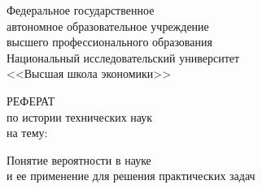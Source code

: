 \documentclass[12pt]{report}
\begin{document}

\thispagestyle{empty}
\begin{center}
Федеральное государственное \\
автономное образовательное учреждение \\
высшего профессионального образования\\

\Large Национальный исследовательский университет\\
\Large <<Высшая школа экономики>>\\



\end{center}

\vbox{\vspace{2cm}}

\hangindent=8cm


\vbox{\vspace{10mm}}\noindent %
\noindent



\begin{center}
\large РЕФЕРАТ \\
\large по истории технических наук\\

\large на тему:

\huge {\sc
Понятие вероятности в науке \\
и ее применение для решения практических задач
}\\

\vbox{\vspace{6mm}} \noindent


\end{center}
\end{document}
